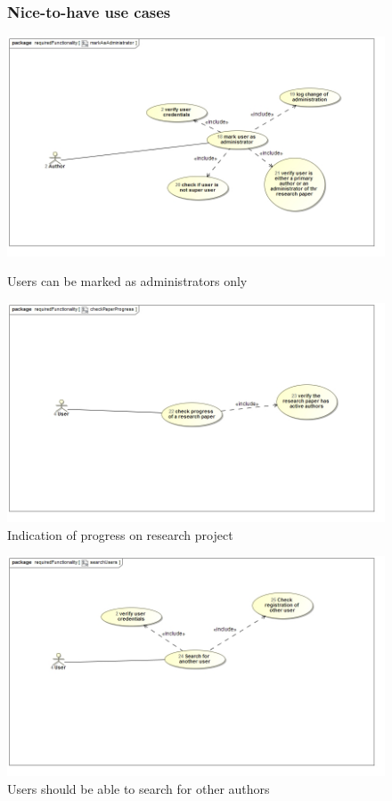 \documentclass[a4paper,12pt]{report}
\begin{document}
\begin{figure}[ht]
\subsubsection{Nice-to-have use cases}
\includegraphics[scale=0.5]{uc__markAsAdministrator.jpg} 
\caption{Users can be marked as administrators only}


\includegraphics[scale=0.5]{uc__checkPaperProgress.jpg} 
\caption{Indication of progress on research project}

\end{figure}
\newpage
\begin{figure}[ht]

\includegraphics[scale=0.5]{uc__searchUsers.jpg} 
\caption{Users should be able to search for other authors}
\end{figure}
\end{document}
